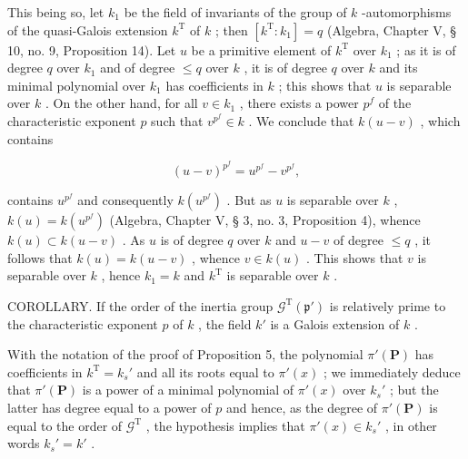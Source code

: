 This being so, let \(k_{1}\) be the field of invariants of the group of \(k\) -automorphisms of the quasi-Galois extension \(k^{\mathrm{T}}\) of \(k\) ; then \([k^{\mathrm{T}}:k_{1}] = q\) (Algebra, Chapter V, § 10, no. 9, Proposition 14). Let \(u\) be a primitive element of \(k^{\mathrm{T}}\) over \(k_{1}\) ; as it is of degree \(q\) over \(k_{1}\) and of degree \(\leqslant q\) over \(k\) , it is of degree \(q\) over \(k\) and its minimal polynomial over \(k_{1}\) has coefficients in \(k\) ; this shows that \(u\) is separable over \(k\) . On the other hand, for all \(v \in k_{1}\) , there exists a power \(p^{f}\) of the characteristic exponent \(p\) such that \(v^{p^{f}} \in k\) . We conclude that \(k(u - v)\) , which contains

\[
(u - v)^{p^{f}} = u^{p^{f}} - v^{p^{f}},
\]

contains \(u^{p^{f}}\) and consequently \(k(u^{p^{f}})\) . But as \(u\) is separable over \(k\) , \(k(u) = k(u^{p^{f}})\) (Algebra, Chapter V, § 3, no. 3, Proposition 4), whence \(k(u) \subset k(u - v)\) . As \(u\) is of degree \(q\) over \(k\) and \(u - v\) of degree \(\leqslant q\) , it follows that \(k(u) = k(u - v)\) , whence \(v \in k(u)\) . This shows that \(v\) is separable over \(k\) , hence \(k_1 = k\) and \(k^{\mathrm{T}}\) is separable over \(k\) .

COROLLARY. If the order of the inertia group \(\mathcal{G}^{\mathrm{T}}(\mathfrak{p}')\) is relatively prime to the characteristic exponent \(p\) of \(k\) , the field \(k'\) is a Galois extension of \(k\) .

With the notation of the proof of Proposition 5, the polynomial \(\pi'(\mathbf{P})\) has coefficients in \(k^{\mathrm{T}} = k_{s}'\) and all its roots equal to \(\pi'(x)\) ; we immediately deduce that \(\pi'(\mathbf{P})\) is a power of a minimal polynomial of \(\pi'(x)\) over \(k_{s}'\) ; but the latter has degree equal to a power of \(p\) and hence, as the degree of \(\pi'(\mathbf{P})\) is equal to the order of \(\mathcal{G}^{\mathrm{T}}\) , the hypothesis implies that \(\pi'(x) \in k_{s}'\) , in other words \(k_{s}' = k'\) .
